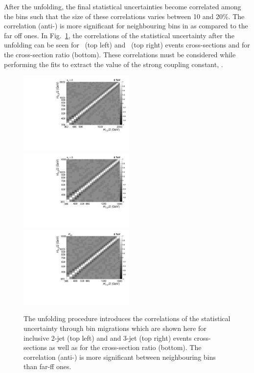 After the unfolding, the final statistical uncertainties become correlated among the bins such that the size of these correlations varies between 10 and 20\%. The correlation (anti-) is more significant for neighbouring bins in \httwo as compared to the far off ones. In Fig.~\ref{fig:corr}, the correlations of the statistical uncertainty after the unfolding can be seen for \njt~(top left) and \njth~(top right) events cross-sections and for the cross-section ratio \ratio (bottom). These correlations must be considered while performing the fits to extract the value of the strong coupling constant, \alpsns. 

\begin{figure}[!h]
 \begin{center}
 \hspace*{-3mm}\includegraphics[width=0.51\textwidth]{Plots_HT_2_150/Correlation_Matrix_NLO_2_ite4.pdf}%
 ~~\includegraphics[width=0.51\textwidth]{Plots_HT_2_150/Correlation_Matrix_NLO_3_ite4.pdf}\\
 \includegraphics[width=0.51\textwidth]{Plots_HT_2_150/Correlation_Matrix_NLO_Ratio_32_ite4.pdf}
 \caption[The unfolding procedure introduces the correlations of the statistical uncertainty through bin migrations.]{The unfolding procedure introduces the correlations of the statistical uncertainty through bin migrations which are shown here for inclusive 2-jet (top left) and and 3-jet (top right) events cross-sections as well as for the cross-section ratio \ratio (bottom). The correlation (anti-) is more significant between neighbouring bins than far-ff ones.}
 \label{fig:corr}
 \end{center}
\end{figure}
